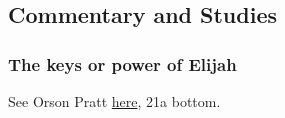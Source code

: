 	
\subsection{Commentary and Studies} %
	\label{ELIJAH-COMMENTARY}

	
		
	\subsubsection{The keys or power of Elijah}
		\label{ELIJAH-keys}
		
		See Orson Pratt \hyperref[EMS-1852-OP-28-AUG-1852]{here}, 21a bottom.